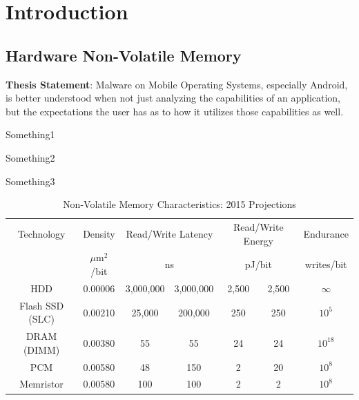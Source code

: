 \chapter{Introduction}
\label{sec:intro}

\section{Hardware Non-Volatile Memory}


\textbf{Thesis Statement}: Malware on Mobile Operating Systems, especially Android, is better understood when not just analyzing the capabilities of an application, but the expectations the user has as to how it utilizes those capabilities as well.\\


\begin{smitemize}
\item Something1
\item Something2
\item Something3
\end{smitemize}





\begin{table}[t]
\begin{small}
\begin{center}
\begin{tabular}{c|cccccc}
Technology & Density  & \multicolumn{2}{c}{Read/Write Latency} & \multicolumn{2}{c}{Read/Write Energy} & Endurance \\
           & $\mu$m$^2$/bit & \multicolumn{2}{c}{ns}                 & \multicolumn{2}{c}{pJ/bit}  & writes/bit\\
\hline
HDD & 0.00006 & 3,000,000 & 3,000,000 & 2,500 & 2,500 & $\infty$ \\
Flash SSD (SLC) & 0.00210 & 25,000 & 200,000 & 250 & 250 & $10^5$ \\
DRAM (DIMM) & 0.00380  & 55 & 55 & 24 & 24 & $10^{18}$ \\
PCM & 0.00580 & 48 & 150 & 2 & 20 & $10^8$ \\
Memristor & 0.00580  & 100 & 100 & 2 & 2 & $10^8$
\end{tabular}
\end{center}
\end{small}
\caption{Non-Volatile Memory Characteristics: 2015 Projections}
\label{tab:nvbm}
\end{table}

